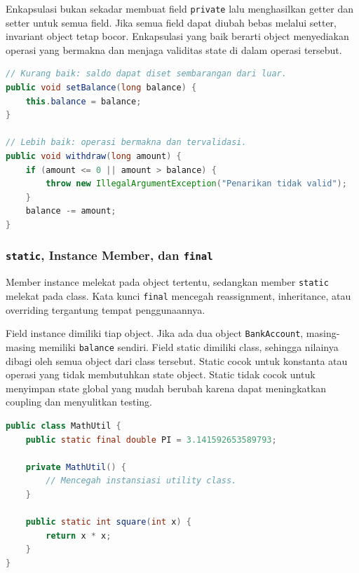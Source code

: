 Enkapsulasi bukan sekadar membuat field \texttt{private} lalu menghasilkan getter dan setter untuk semua field. Jika semua field dapat diubah bebas melalui setter, invariant object tetap bocor. Enkapsulasi yang baik berarti object menyediakan operasi yang bermakna dan menjaga validitas state di dalam operasi tersebut.

\begin{lstlisting}[language=Java, caption={Getter/setter buruk vs method domain yang menjaga invariant}, label={lst:encapsulation}]
// Kurang baik: saldo dapat diset sembarangan dari luar.
public void setBalance(long balance) {
    this.balance = balance;
}

// Lebih baik: operasi bermakna dan tervalidasi.
public void withdraw(long amount) {
    if (amount <= 0 || amount > balance) {
        throw new IllegalArgumentException("Penarikan tidak valid");
    }
    balance -= amount;
}
\end{lstlisting}

\subsubsection{\texttt{static}, Instance Member, dan \texttt{final}}

\begin{jawab}
Member instance melekat pada object tertentu, sedangkan member \texttt{static} melekat pada class. Kata kunci \texttt{final} mencegah reassignment, inheritance, atau overriding tergantung tempat penggunaannya.
\end{jawab}

Field instance dimiliki tiap object. Jika ada dua object \texttt{BankAccount}, masing-masing memiliki \texttt{balance} sendiri. Field static dimiliki class, sehingga nilainya dibagi oleh semua object dari class tersebut. Static cocok untuk konstanta atau operasi yang tidak membutuhkan state object. Static tidak cocok untuk menyimpan state global yang mudah berubah karena dapat meningkatkan coupling dan menyulitkan testing.

\begin{lstlisting}[language=Java, caption={Instance member, static member, dan final}, label={lst:static-final}]
public class MathUtil {
    public static final double PI = 3.141592653589793;

    private MathUtil() {
        // Mencegah instansiasi utility class.
    }

    public static int square(int x) {
        return x * x;
    }
}
\end{lstlisting}

